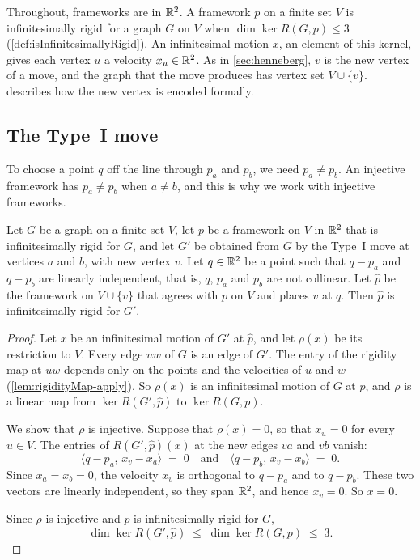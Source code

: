 Throughout, frameworks are in ${\mathbb{R}}^{2}$. A framework $p$ on a finite
set $V$ is infinitesimally rigid for a graph $G$ on $V$ when
$\dim \ker R(G, p) \le 3$ (\cref{def:isInfinitesimallyRigid}). An
infinitesimal motion $x$, an element of this kernel, gives each
vertex $u$ a velocity $x_u \in {\mathbb{R}}^{2}$. As in \cref{sec:henneberg},
$v$ is the new vertex of a move, and the graph that the move produces
has vertex set $V \cup \{v\}$. 
describes how the new vertex is encoded formally.

\subsection{The Type~I move}

To choose a point $q$ off the line through $p_a$ and $p_b$, we need
$p_a \ne p_b$. An injective framework has $p_a \ne p_b$ when
$a \ne b$, and this is why we work with injective frameworks.

\begin{theorem}
  \label{thm:typeI-isInfinitesimallyRigid-extend}
  \leanok
  Let $G$ be a graph on a finite set $V$, let $p$ be a framework on
  $V$ in ${\mathbb{R}}^{2}$ that is infinitesimally rigid for $G$, and let $G'$
  be obtained from $G$ by the Type~I move at vertices $a$ and $b$, with
  new vertex $v$. Let $q \in {\mathbb{R}}^{2}$ be a point such
  that $q - p_a$ and $q - p_b$ are linearly independent, that is,
  $q$, $p_a$ and $p_b$ are not collinear. Let $\hat p$ be the
  framework on $V \cup \{v\}$ that agrees with $p$ on $V$ and places
  $v$ at $q$. Then $\hat p$ is infinitesimally rigid
  for $G'$.
\end{theorem}
\begin{proof}
  \leanok
  Let $x$ be an infinitesimal motion of $G'$ at $\hat p$, and let
  $\rho(x)$ be its restriction to $V$. Every edge $uw$ of $G$ is an
  edge of $G'$. The entry of the rigidity map at $uw$ depends only on
  the points and the velocities of $u$ and $w$
  (\cref{lem:rigidityMap-apply}). So $\rho(x)$ is an infinitesimal
  motion of $G$ at $p$, and $\rho$ is a linear map from
  $\ker R(G', \hat p)$ to $\ker R(G, p)$.

  We show that $\rho$ is injective. Suppose that $\rho(x) = 0$, so
  that $x_u = 0$ for every $u \in V$. The entries of
  $R(G', \hat p)(x)$ at the new edges $va$ and $vb$ vanish:
  \[
    \langle q - p_a,\, x_v - x_a \rangle \;=\; 0
    \quad\text{and}\quad
    \langle q - p_b,\, x_v - x_b \rangle \;=\; 0.
  \]
  Since $x_a = x_b = 0$, the velocity $x_v$ is orthogonal to
  $q - p_a$ and to $q - p_b$. These two vectors are linearly
  independent, so they span ${\mathbb{R}}^{2}$, and hence $x_v = 0$. So $x = 0$.

  Since $\rho$ is injective and $p$ is infinitesimally rigid for $G$,
  \[
    \dim \ker R(G', \hat p) \;\le\; \dim \ker R(G, p) \;\le\; 3.
  \]
\end{proof}

